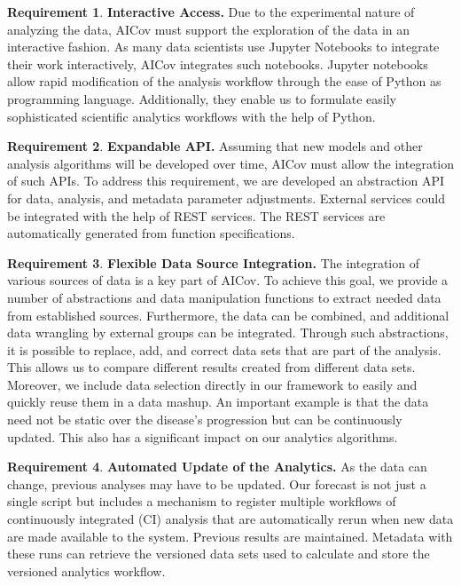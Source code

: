 \documentclass[12pt]{article}
\theoremstyle{definition}
\newtheorem{requirement}{Requirement}
\renewcommand{\_}{%
    \textunderscore\hspace{0pt}%
}
\begin{document}
\begin{requirement}{\bf Interactive Access.} Due to the experimental nature of analyzing the data, AICov must support the exploration of the data in an interactive fashion. \Solution As many data scientists use Jupyter Notebooks to integrate their work interactively, AICov integrates such notebooks. Jupyter notebooks allow rapid modification of the analysis workflow through the ease of Python as programming language. Additionally, they enable us to formulate easily sophisticated scientific analytics workflows with the help of Python.
\end{requirement}


\begin{requirement}{\bf Expandable API.} Assuming that new models and other analysis algorithms will be developed over time, AICov must allow the integration of such APIs. \Solution To address this requirement, we are developed an abstraction API for data, analysis, and metadata parameter adjustments. External services could be integrated with the help of REST services. The REST services are automatically generated from function specifications. 
\end{requirement}


\begin{requirement}{\bf Flexible Data Source Integration.} The integration of various sources of data is a key part of AICov. \Solution To achieve this goal, we provide a number of abstractions and data manipulation functions to extract needed data from established sources. Furthermore, the data can be combined, and additional data wrangling by external groups can be integrated.
Through such abstractions, it is possible to replace, add, and correct data sets that are part of the analysis. This allows us to compare different results created from different data sets. Moreover, we include data selection directly in our framework to easily and quickly reuse them in a data mashup. An important example is that the data need not be static over the disease's progression but can be continuously updated. This also has a significant impact on our analytics algorithms.
\end{requirement}

\begin{requirement}{\bf Automated Update of the Analytics.} As the data can change, previous analyses may have to be updated. \Solution Our forecast is not just a single script but includes a mechanism to register multiple workflows of continuously integrated (CI) analysis that are automatically rerun when new data are made available to the system. Previous results are maintained. Metadata with these runs can retrieve the versioned data sets used to calculate and store the versioned analytics workflow.
\end{requirement}
\end{document}
